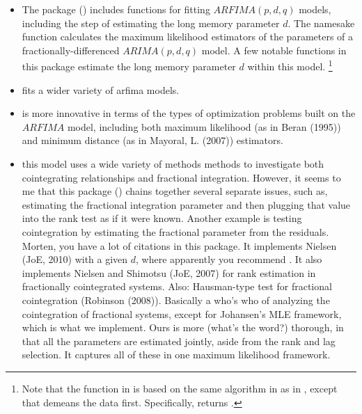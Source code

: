 \documentclass[article]{jss}
\newcommand{\fct}[1]{\code{#1()}}
\begin{document}
\begin{itemize} 

	\item The  package (\cite{fracdiff2020}) includes functions for fitting $ARFIMA(p,d,q)$ models, including the step of estimating the long memory parameter $d$. The namesake function \fct{fracdiff} calculates the maximum likelihood estimators of the parameters of a fractionally-differenced $ARIMA(p,d,q)$ model. A few notable functions in this package estimate the long memory parameter $d$ within this model. 
\footnote{Note that the \fct{diffseries} function in  is based on the same algorithm in \cite{Jensen2014} as \fct{FracDiff} in , except that \fct{diffseries} demeans the data first. Specifically,  returns .}

	\item {} \cite{arfima2018} fits a wider variety of arfima models. 

	\item {} \cite{nsarfima2019} is more innovative in terms of the types of optimization problems built on the $ARFIMA$ model, including both maximum likelihood (as in Beran (1995)) and minimum distance (as in Mayoral, L. (2007)) estimators. 

	\item {} this model uses a wide variety of methods methods to investigate both cointegrating relationships and fractional integration. 
However, it seems to me that this package (\cite{LongMemoryTS2019}) chains together several separate issues, such as, estimating the fractional integration parameter and then plugging that value into the rank test as if it were known. Another example is testing cointegration by estimating the fractional parameter from the residuals.  
Morten, you have a lot of citations in this package. It implements Nielsen (JoE, 2010) with a given $d$, where apparently you recommend . It also implements Nielsen and Shimotsu (JoE, 2007) for rank estimation in fractionally cointegrated systems. Also: Hausman-type test for fractional cointegration (Robinson (2008)). Basically a who's who of analyzing the cointegration of fractional systems, except for Johansen's MLE framework, which is what we implement.
Ours is more (what's the word?) thorough, in that all the parameters are estimated jointly, aside from the rank and lag selection. It captures all of these in one maximum likelihood framework. 

\end{itemize} 
\end{document}

